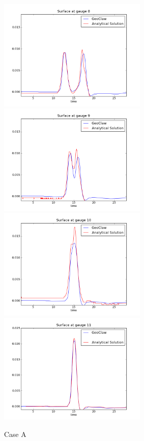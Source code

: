 \begin{figure}[ht]
\vskip 5pt
\hfil\includegraphics[width=2.8in]{bp2/CaseA/gauge0008fig300.png}\hfil
\hfil\includegraphics[width=2.8in]{bp2/CaseA/gauge0009fig300.png}\hfil
\vskip 5pt
\hfil\includegraphics[width=2.8in]{bp2/CaseA/gauge0010fig300.png}\hfil
\hfil\includegraphics[width=2.8in]{bp2/CaseA/gauge0011fig300.png}\hfil
\caption{\label{fig:bp2A} Case A }
\end{figure}

